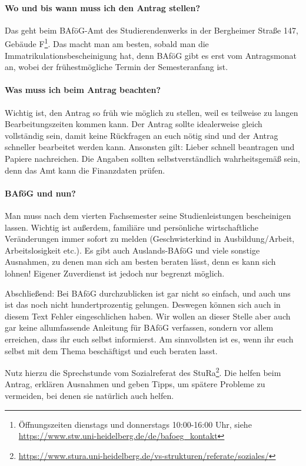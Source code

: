 \vspace{-2mm}
\paragraph{Wo und bis wann muss ich den Antrag stellen?}
Das geht beim BAföG-Amt des Studierendenwerks in der Bergheimer Straße 147, Gebäude F\footnote{Öffnungszeiten dienstags und donnerstags 10:00-16:00 Uhr, siehe \url{https://www.stw.uni-heidelberg.de/de/bafoeg_kontakt}}. Das macht man am besten, sobald man die Immatrikulationsbescheinigung hat, denn BAföG gibt es erst vom Antragsmonat an, wobei der frühestmögliche Termin der Semesteranfang ist.

\vspace{-2mm}
\paragraph{Was muss ich beim Antrag beachten?}
Wichtig ist, den Antrag so früh wie möglich zu stellen, weil es teilweise zu langen Bearbeitungszeiten kommen kann. Der Antrag sollte idealerweise gleich vollständig sein, damit keine Rückfragen an euch nötig sind und der Antrag schneller bearbeitet werden kann. Ansonsten gilt: Lieber schnell beantragen und Papiere nachreichen. Die Angaben sollten selbstverständlich wahrheitsgemäß sein, denn das Amt kann die Finanzdaten prüfen.

\vspace{-2mm}
\paragraph{BAföG und nun?}
Man muss nach dem vierten Fachsemester seine Studienleistungen bescheinigen lassen. Wichtig ist außerdem,  familiäre und persönliche wirtschaftliche Veränderungen immer sofort zu melden (Geschwisterkind in Ausbildung/Arbeit, Arbeitslosigkeit etc.). Es gibt auch Auslands-BAföG und viele sonstige Ausnahmen, zu denen man sich am besten beraten lässt, denn es kann sich lohnen! Eigener Zuverdienst ist jedoch nur begrenzt möglich.

\noindent Abschließend: Bei BAföG durchzublicken ist gar nicht so einfach, und auch uns ist das noch nicht hundertprozentig gelungen. Deswegen können sich auch in diesem Text Fehler eingeschlichen haben. Wir wollen an dieser Stelle aber auch gar keine allumfassende Anleitung für BAföG verfassen, sondern vor allem erreichen, dass ihr euch selbst informierst. Am sinnvollsten ist es, wenn ihr euch selbst mit dem Thema beschäftigst und euch beraten lasst.

Nutz hierzu die Sprechstunde vom Sozialreferat des \gls{StuRa}\footnote{\url{https://www.stura.uni-heidelberg.de/vs-strukturen/referate/soziales/}}. Die helfen beim Antrag, erklären Ausnahmen und geben Tipps, um spätere Probleme zu vermeiden, bei denen sie natürlich auch helfen.
